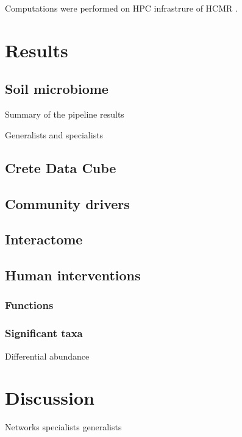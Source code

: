 \documentclass[unnumsec,webpdf,contemporary,large]{oup-authoring-template}%
\theoremstyle{thmstyleone}%
\theoremstyle{thmstyletwo}%
\theoremstyle{thmstylethree}%
\begin{document}
Computations were performed on HPC infrastrure of HCMR \cite{Zafeiropoulos2021}.

\section{Results}\label{results}

\subsection{Soil microbiome}\label{soil_microbiome}

Summary of the pipeline results

Generalists and specialists


\subsection{Crete Data Cube}\label{data_cube}

\subsection{Community drivers}\label{Drivers}

\subsection{Interactome}\label{interactome}

\subsection{Human interventions}\label{Human interventions}

\subsubsection{Functions}\label{functions}

\subsubsection{Significant taxa}\label{sig_taxa}

Differential abundance

\section{Discussion}\label{discussion}

Networks specialists generalists \cite{Barberan2012}
\end{document}

